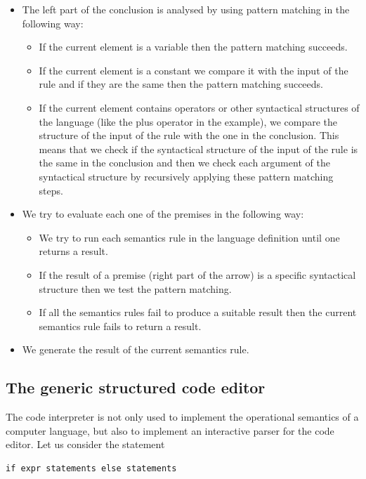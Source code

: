 \begin{itemize}
	\item The left part of the conclusion is analysed by using pattern matching in the following way:
	\begin{itemize}
		\item If the current element is a variable then the pattern matching succeeds.
		\item If the current element is a constant we compare it with the input of the rule and if they are the same then the pattern matching succeeds.
		\item If the current element contains operators or other syntactical structures of the language (like the plus operator in the example), we compare the structure of the input of the rule with the one in the conclusion. This means that we check if the syntactical structure of the input of the rule is the same in the conclusion and then we check each argument of the syntactical structure by recursively applying these pattern matching steps.
	\end{itemize}
	\item We try to evaluate each one of the premises in the following way:
	\begin{itemize}
		\item We try to run each semantics rule in the language definition until one returns a result.
		\item If the result of a premise (right part of the arrow) is a specific syntactical structure then we test the pattern matching.
		\item If all the semantics rules fail to produce a suitable result then the current semantics rule fails to return a result.
	\end{itemize}
	\item We generate the result of the current semantics rule.
\end{itemize}

\subsection{The generic structured code editor}
The code interpreter is not only used to implement the operational semantics of a computer language, but also to implement an interactive parser for the code editor. Let us consider the statement

\begin{lstlisting}
if expr statements else statements
\end{lstlisting}

